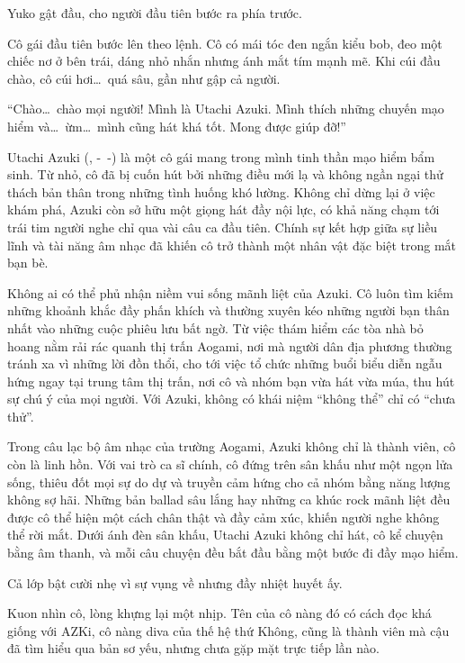 \documentclass[../main.tex]{subfiles}
\begin{document}
Yuko gật đầu, cho người đầu tiên bước ra phía trước.

Cô gái đầu tiên bước lên theo lệnh. Cô có mái tóc đen ngắn kiểu bob, đeo một chiếc nơ ở bên trái, dáng nhỏ nhắn nhưng ánh mắt tím mạnh mẽ. Khi cúi đầu chào, cô cúi hơi\dots\ quá sâu, gần như gập cả người.

``Chào\dots\ chào mọi người! Mình là Utachi Azuki. Mình thích những chuyến mạo hiểm và\dots\ ừm\dots\ mình cũng hát khá tốt. Mong được giúp đỡ!''

\chrint

Utachi Azuki (, -\ -) là một cô gái mang trong mình tinh thần mạo hiểm bẩm sinh. Từ nhỏ, cô đã bị cuốn hút bởi những điều mới lạ và không ngần ngại thử thách bản thân trong những tình huống khó lường. Không chỉ dừng lại ở việc khám phá, Azuki còn sở hữu một giọng hát đầy nội lực, có khả năng chạm tới trái tim người nghe chỉ qua vài câu ca đầu tiên. Chính sự kết hợp giữa sự liều lĩnh và tài năng âm nhạc đã khiến cô trở thành một nhân vật đặc biệt trong mắt bạn bè.

Không ai có thể phủ nhận niềm vui sống mãnh liệt của Azuki. Cô luôn tìm kiếm những khoảnh khắc đầy phấn khích và thường xuyên kéo những người bạn thân nhất vào những cuộc phiêu lưu bất ngờ. Từ việc thám hiểm các tòa nhà bỏ hoang nằm rải rác quanh thị trấn Aogami, nơi mà người dân địa phương thường tránh xa vì những lời đồn thổi, cho tới việc tổ chức những buổi biểu diễn ngẫu hứng ngay tại trung tâm thị trấn, nơi cô và nhóm bạn vừa hát vừa múa, thu hút sự chú ý của mọi người. Với Azuki, không có khái niệm ``không thể'' chỉ có ``chưa thử''.

Trong câu lạc bộ âm nhạc của trường Aogami, Azuki không chỉ là thành viên, cô còn là linh hồn. Với vai trò ca sĩ chính, cô đứng trên sân khấu như một ngọn lửa sống, thiêu đốt mọi sự do dự và truyền cảm hứng cho cả nhóm bằng năng lượng không sợ hãi. Những bản ballad sâu lắng hay những ca khúc rock mãnh liệt đều được cô thể hiện một cách chân thật và đầy cảm xúc, khiến người nghe không thể rời mắt. Dưới ánh đèn sân khấu, Utachi Azuki không chỉ hát, cô kể chuyện bằng âm thanh, và mỗi câu chuyện đều bắt đầu bằng một bước đi đầy mạo hiểm.

\chrint

Cả lớp bật cười nhẹ vì sự vụng về nhưng đầy nhiệt huyết ấy.

Kuon nhìn cô, lòng khựng lại một nhịp. Tên của cô nàng đó có cách đọc khá giống với AZKi, cô nàng diva của thế hệ thứ Không, cũng là thành viên mà cậu đã tìm hiểu qua bản sơ yếu, nhưng chưa gặp mặt trực tiếp lần nào.
\end{document}
